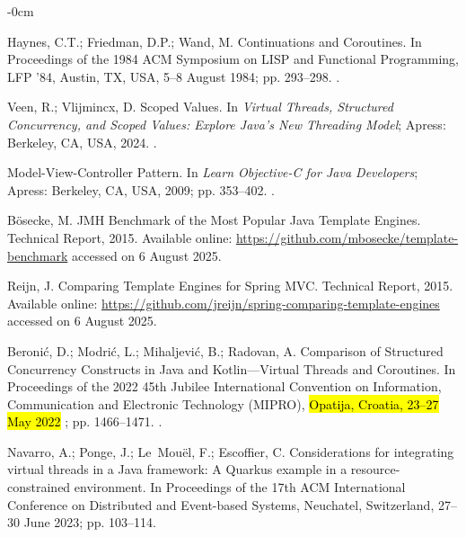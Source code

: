 \documentclass[software,article,accept,pdftex,moreauthors]{Definitions/mdpi}
\begin{document}
\begin{adjustwidth}{-\extralength}{0cm}
\begin{thebibliography}{999}
Haynes, C.T.; Friedman, D.P.; Wand, M.
\newblock Continuations and Coroutines.
\newblock In Proceedings of the 1984 ACM Symposium on LISP
  and Functional Programming, LFP '84, Austin, TX, USA, 5--8 August 1984; pp. 293–298.
.

Veen, R.; Vlijmincx, D. Scoped Values.
\newblock In {\em Virtual Threads, Structured Concurrency, and Scoped Values:
  Explore Java's New Threading Model}; Apress: Berkeley, CA, USA, 2024.
.

Model-View-Controller Pattern.
\newblock In {\em Learn Objective-C for Java Developers}; Apress: Berkeley, CA, USA, 
   2009; pp. 353--402.
.

Bösecke, M.
\newblock JMH Benchmark of the Most Popular Java Template Engines.
\newblock Technical Report, 2015.
  Available online: \url{https://github.com/mbosecke/template-benchmark} accessed on 6 August 2025.


Reijn, J.
\newblock Comparing Template Engines for Spring MVC.
\newblock Technical Report, 2015.
 Available online: \url{https://github.com/jreijn/spring-comparing-template-engines} accessed on 6 August 2025.

Beronić, D.; Modrić, L.; Mihaljević, B.; Radovan, A.
\newblock Comparison of Structured Concurrency Constructs in Java and Kotlin---Virtual Threads and Coroutines.
\newblock In Proceedings of the 2022 45th Jubilee International Convention on
  Information, Communication and Electronic Technology (MIPRO), \hl{Opatija, Croatia, 23--27 May 2022}%
; pp. 1466--1471.
.

Navarro, A.; Ponge, J.; Le~Mou{\"e}l, F.; Escoffier, C.
\newblock Considerations for integrating virtual threads in a Java framework: A
  Quarkus example in a resource-constrained environment.
\newblock In Proceedings of the 17th ACM International
  Conference on Distributed and Event-based Systems, Neuchatel, Switzerland, 27--30 June 2023; pp. 103--114.


\end{thebibliography}
\end{adjustwidth}
\end{document}
